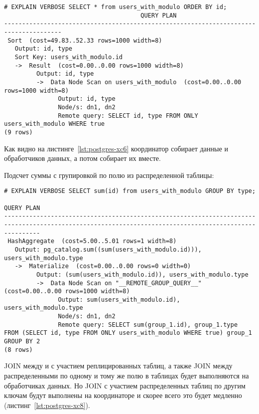 \begin{lstlisting}[label=lst:postgres-xc6,caption=Выборка записей из распределенной таблицы]
# EXPLAIN VERBOSE SELECT * from users_with_modulo ORDER BY id;
                                      QUERY PLAN                                      
--------------------------------------------------------------------------------------
 Sort  (cost=49.83..52.33 rows=1000 width=8)
   Output: id, type
   Sort Key: users_with_modulo.id
   ->  Result  (cost=0.00..0.00 rows=1000 width=8)
         Output: id, type
         ->  Data Node Scan on users_with_modulo  (cost=0.00..0.00 rows=1000 width=8)
               Output: id, type
               Node/s: dn1, dn2
               Remote query: SELECT id, type FROM ONLY users_with_modulo WHERE true
(9 rows)
\end{lstlisting}

Как видно на листинге~\ref{lst:postgres-xc6} координатор собирает данные и обработчиков данных, а потом собирает их вместе. 

Подсчет суммы с групировкой по полю из распределенной таблицы:

\begin{lstlisting}[label=lst:postgres-xc7,caption=Выборка записей из распределенной таблицы]
# EXPLAIN VERBOSE SELECT sum(id) from users_with_modulo GROUP BY type;
                                                                      QUERY PLAN                                                                      
------------------------------------------------------------------------------------------------------------------------------------------------------
 HashAggregate  (cost=5.00..5.01 rows=1 width=8)
   Output: pg_catalog.sum((sum(users_with_modulo.id))), users_with_modulo.type
   ->  Materialize  (cost=0.00..0.00 rows=0 width=0)
         Output: (sum(users_with_modulo.id)), users_with_modulo.type
         ->  Data Node Scan on "__REMOTE_GROUP_QUERY__"  (cost=0.00..0.00 rows=1000 width=8)
               Output: sum(users_with_modulo.id), users_with_modulo.type
               Node/s: dn1, dn2
               Remote query: SELECT sum(group_1.id), group_1.type  FROM (SELECT id, type FROM ONLY users_with_modulo WHERE true) group_1 GROUP BY 2  
(8 rows)
\end{lstlisting}

JOIN между и с участием реплицированных таблиц, а также JOIN между распределенными по одному и тому же полю в таблицах будет выполняются на обработчиках данных. Но JOIN с участием распределенных таблиц по другим ключам будут выполнены на координаторе и скорее всего это будет медленно (листинг~\ref{lst:postgres-xc8}).

